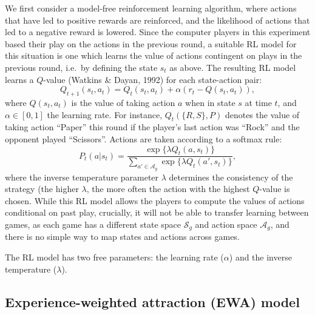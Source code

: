 \documentclass[english,man,floatsintext]{apa6}
\begin{document}
We first consider a model-free reinforcement learning algorithm, where actions that have led to positive rewards are reinforced, and the likelihood of actions that led to a negative reward is lowered. Since the computer players in this experiment based their play on the actions in the previous round, a suitable RL model for this situation is one which learns the value of actions contingent on plays in the previous round, i.e.~by defining the state \(s_{t}\) as above. The resulting RL model learns a \(Q\)-value (Watkins \& Dayan, 1992) for each state-action pair:
\[Q_{t+1}(s_{t},a_{t}) = Q_{t}(s_{t},a_{t}) + \alpha \left( r_{t}  - Q(s_{t},a_{t}) \right) ,\]
where \(Q(s_{t},a_{t})\) is the value of taking action \(a\) when in state \(s\) at time \(t\), and \(\alpha \in [0,1]\) the learning rate. For instance, \(Q_t(\{R,S\},P)\) denotes the value of taking action \enquote{Paper} this round if the player's last action was \enquote{Rock} and the opponent played \enquote{Scissors}. Actions are taken according to a softmax rule:
\[P_{t}(a|s_t) = \frac{\exp \{ \lambda Q_{t}(a,s_t) \}}{\sum_{a' \in \mathcal{A}_g} \exp \{\lambda  Q_{t}(a',s_t) \}}, \]
where the inverse temperature parameter \(\lambda\) determines the consistency of the strategy (the higher \(\lambda\), the more often the action with the highest \(Q\)-value is chosen. While this RL model allows the players to compute the values of actions conditional on past play, crucially, it will not be able to transfer learning between games, as each game has a different state space \(\mathcal{S}_g\) and action space \(\mathcal{A}_g\), and there is no simple way to map states and actions across games.

The RL model has two free parameters: the learning rate (\(\alpha\)) and the inverse temperature (\(\lambda\)).

\hypertarget{experience-weighted-attraction-ewa-model}{%
\subsection{Experience-weighted attraction (EWA) model}\label{experience-weighted-attraction-ewa-model}}
\end{document}
